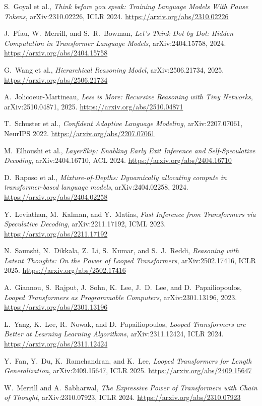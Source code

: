 \documentclass[11pt,letterpaper]{article}
\begin{document}
\begin{enumerate}[label={\textcolor{deepindigo}{[\arabic*]}}, leftmargin=2.6em, itemsep=0.3em]
  \item S.~Goyal et al., \emph{Think before you speak: Training Language Models With Pause Tokens}, arXiv:2310.02226, ICLR 2024. \url{https://arxiv.org/abs/2310.02226}
  \item J.~Pfau, W.~Merrill, and S.~R.~Bowman, \emph{Let's Think Dot by Dot: Hidden Computation in Transformer Language Models}, arXiv:2404.15758, 2024. \url{https://arxiv.org/abs/2404.15758}
  \item G.~Wang et al., \emph{Hierarchical Reasoning Model}, arXiv:2506.21734, 2025. \url{https://arxiv.org/abs/2506.21734}
  \item A.~Jolicoeur-Martineau, \emph{Less is More: Recursive Reasoning with Tiny Networks}, arXiv:2510.04871, 2025. \url{https://arxiv.org/abs/2510.04871}
  \item T.~Schuster et al., \emph{Confident Adaptive Language Modeling}, arXiv:2207.07061, NeurIPS 2022. \url{https://arxiv.org/abs/2207.07061}
  \item M.~Elhoushi et al., \emph{LayerSkip: Enabling Early Exit Inference and Self-Speculative Decoding}, arXiv:2404.16710, ACL 2024. \url{https://arxiv.org/abs/2404.16710}
  \item D.~Raposo et al., \emph{Mixture-of-Depths: Dynamically allocating compute in transformer-based language models}, arXiv:2404.02258, 2024. \url{https://arxiv.org/abs/2404.02258}
  \item Y.~Leviathan, M.~Kalman, and Y.~Matias, \emph{Fast Inference from Transformers via Speculative Decoding}, arXiv:2211.17192, ICML 2023. \url{https://arxiv.org/abs/2211.17192}
  \item N.~Saunshi, N.~Dikkala, Z.~Li, S.~Kumar, and S.~J.~Reddi, \emph{Reasoning with Latent Thoughts: On the Power of Looped Transformers}, arXiv:2502.17416, ICLR 2025. \url{https://arxiv.org/abs/2502.17416}
  \item A.~Giannou, S.~Rajput, J.~Sohn, K.~Lee, J.~D.~Lee, and D.~Papailiopoulos, \emph{Looped Transformers as Programmable Computers}, arXiv:2301.13196, 2023. \url{https://arxiv.org/abs/2301.13196}
  \item L.~Yang, K.~Lee, R.~Nowak, and D.~Papailiopoulos, \emph{Looped Transformers are Better at Learning Learning Algorithms}, arXiv:2311.12424, ICLR 2024. \url{https://arxiv.org/abs/2311.12424}
  \item Y.~Fan, Y.~Du, K.~Ramchandran, and K.~Lee, \emph{Looped Transformers for Length Generalization}, arXiv:2409.15647, ICLR 2025. \url{https://arxiv.org/abs/2409.15647}
  \item W.~Merrill and A.~Sabharwal, \emph{The Expressive Power of Transformers with Chain of Thought}, arXiv:2310.07923, ICLR 2024. \url{https://arxiv.org/abs/2310.07923}

\end{enumerate}
\end{document}

